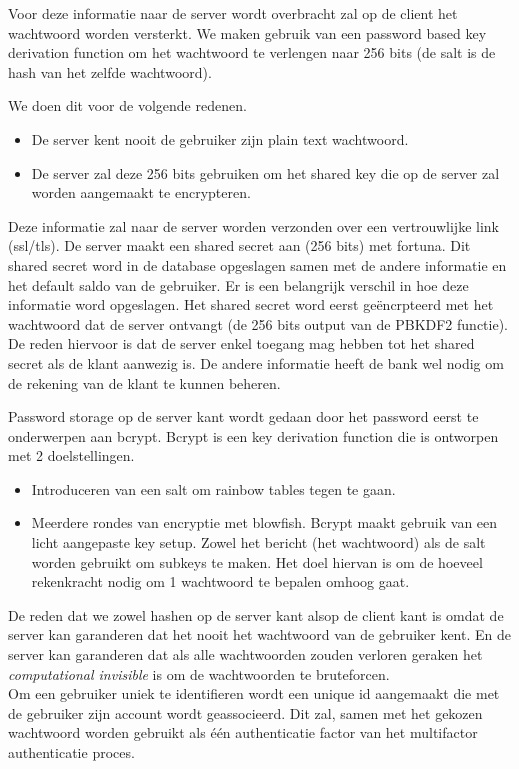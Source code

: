 \documentclass[11pt]{article}
\begin{document}
Voor deze informatie naar de server wordt overbracht zal op de client het wachtwoord worden versterkt. We maken gebruik van een password based key derivation function om het wachtwoord te verlengen naar 256 bits (de salt is de hash van het zelfde wachtwoord). 

We doen dit voor de volgende redenen.
\begin{itemize}
\item De server kent nooit de gebruiker zijn plain text wachtwoord. 
\item De server zal deze 256 bits gebruiken om het shared key die op de server zal worden aangemaakt te encrypteren.
\end{itemize}

Deze informatie zal naar de server worden verzonden over een vertrouwlijke link (ssl/tls). 
De server maakt een shared secret aan (256 bits) met fortuna. Dit shared secret word in de database opgeslagen samen met de andere informatie en het default saldo van de gebruiker. Er is een belangrijk verschil in hoe deze informatie word opgeslagen. Het shared secret word eerst ge\"encrpteerd met het wachtwoord dat de server ontvangt (de 256 bits output van de PBKDF2 functie). De reden hiervoor is dat de server enkel toegang mag hebben tot het shared secret als de klant aanwezig is. De andere informatie heeft de bank wel nodig om de rekening van de klant te kunnen beheren.

Password storage op de server kant wordt gedaan door het password eerst te onderwerpen aan bcrypt. Bcrypt is een key derivation function die is ontworpen met 2 doelstellingen.
\begin{itemize}
\item Introduceren van een salt om rainbow tables tegen te gaan.
\item Meerdere rondes van encryptie met blowfish. Bcrypt maakt gebruik van een licht aangepaste key setup. Zowel het bericht (het wachtwoord) als de salt worden gebruikt om subkeys te maken. Het doel hiervan is om de hoeveel rekenkracht nodig om 1 wachtwoord te bepalen omhoog gaat. 
\end{itemize}
De reden dat we zowel hashen op de server kant alsop de client kant is omdat de server kan garanderen dat het nooit het wachtwoord van de gebruiker kent. En de server kan garanderen dat als alle wachtwoorden zouden verloren geraken het \emph{computational invisible} is om de wachtwoorden te bruteforcen.\\

Om een gebruiker uniek te identifieren wordt een unique id aangemaakt die met de gebruiker zijn account wordt geassocieerd. Dit zal, samen met het gekozen wachtwoord worden gebruikt als één authenticatie factor van het multifactor authenticatie proces.
	
\end{document}
